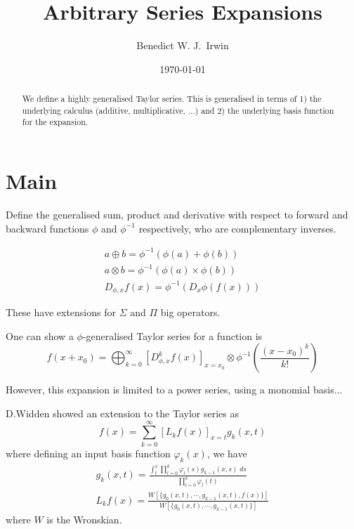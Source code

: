 \documentclass{article}
\title{Arbitrary Series Expansions}
\date{\today}
\begin{document}
%

\author[1]{Benedict W. J.~Irwin}


\maketitle

\begin{abstract}
We define a highly generalised Taylor series. This is generalised in terms of 1) the underlying calculus (additive, multiplicative, ...) and 2) the underlying basis function for the expansion.
\end{abstract}

\section{Main}
Define the generalised sum, product and derivative with respect to forward and backward functions $\phi$ and $\phi^{-1}$ respectively, who are complementary inverses.

\begin{align}
a \oplus b = \phi^{-1}( \phi(a) + \phi(b) ) \\
a \otimes b = \phi^{-1}( \phi(a) \times \phi(b) ) \\
D_{\phi,x} f(x) = \phi^{-1}( D_x \phi(f(x)) )
\end{align}

These have extensions for $\Sigma$ and $\Pi$ big operators.

One can show a $\phi$-generalised Taylor series for a function is
$$
f(x+x_0) = \bigoplus_{k=0}^{\infty} \left[D^{k}_{\phi, x}f(x) \right]_{x=x_0} \otimes \phi^{-1}\left( \frac{(x-x_0)^k}{k!}\right)
$$

However, this expansion is limited to a power series, using a monomial basis... 

D.Widden showed an extension to the Taylor series as
$$
f(x) = \sum_{k=0}^\infty \left[L_k f(x)\right]_{x=t} g_k(x,t)
$$
where defining an input basis function $\varphi_k(x)$, we have
\begin{align}
g_k(x,t) = \frac{\int_t^x \prod_{l=0}^k \varphi_l(s)g_{k-1}(x,s)\;ds}{\prod_{l=0}^k \varphi_l(t)} \\
L_k f(x) = \frac{W[\{g_0(x,t),\cdots,g_{k-1}(x,t),f(x)\}]}{W[\{g_0(x,t),\cdots,g_{k-1}(x,t)\}]}
\end{align}
where $W$ is the Wronskian.
\end{document}
